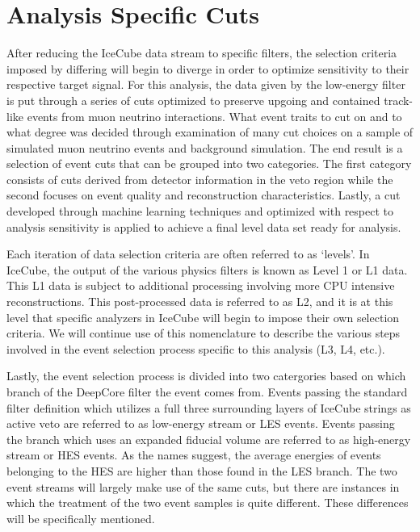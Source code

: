 \documentclass{gatech-thesis}
\begin{document}
\section{Analysis Specific Cuts}
After reducing the IceCube data stream to specific filters, the selection criteria imposed by differing will begin to diverge in order to optimize sensitivity to their respective target signal. For this analysis, the data given by the low-energy filter is put through a series of cuts optimized to preserve upgoing and contained track-like events from muon neutrino interactions. What event traits to cut on and to what degree was decided through examination of many cut choices on a sample of simulated muon neutrino events and background simulation. The end result is a selection of event cuts that can be grouped into two categories. The first category consists of cuts derived from detector information in the veto region while the second focuses on event quality and reconstruction characteristics. Lastly, a cut developed through machine learning techniques and optimized with respect to analysis sensitivity is applied to achieve a final level data set ready for analysis.

Each iteration of data selection criteria are often referred to as `levels'. In IceCube, the output of the various physics filters is known as Level 1 or L1 data. This L1 data is subject to additional processing involving more CPU intensive reconstructions. This post-processed data is referred to as L2, and it is at this level that specific analyzers in IceCube will begin to impose their own selection criteria. We will continue use of this nomenclature to describe the various steps involved in the event selection process specific to this analysis (L3, L4, etc.).

Lastly, the event selection process is divided into two catergories based on which branch of the DeepCore filter the event comes from. Events passing the standard filter definition which utilizes a full three surrounding layers of IceCube strings as active veto are referred to as low-energy stream or LES events. Events passing the branch which uses an expanded fiducial volume are referred to as high-energy stream or HES events. As the names suggest, the average energies of events belonging to the HES are higher than those found in the LES branch. The two event streams will largely make use of the same cuts, but there are instances in which the treatment of the two event samples is quite different. These differences will be specifically mentioned.
\end{document}
